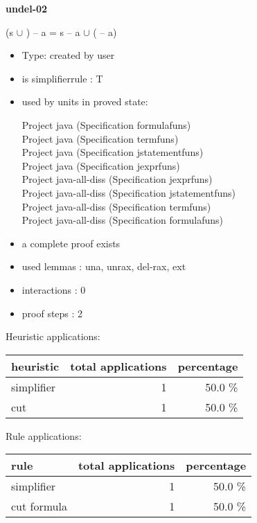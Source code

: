 \documentclass[a4paper]{article}
\begin{document}
{\LARGE\bf undel-02}\label{lemma-undel-02}

\medskip

 \Fol (s $\cup$ ) -- a = s -- a $\cup$ ( -- a)

\begin{itemize}

\item Type: created by user

\item is simplifierrule : T
\item used by units in proved state:

Project java (Specification formulafuns) \\
Project java (Specification termfuns) \\
Project java (Specification jstatementfuns) \\
Project java (Specification jexprfuns) \\
Project java-all-diss (Specification jexprfuns) \\
Project java-all-diss (Specification jstatementfuns) \\
Project java-all-diss (Specification termfuns) \\
Project java-all-diss (Specification formulafuns)
\item       a complete proof exists
\item       used lemmas  : una, unrax, del-rax, ext
\item       interactions : 0
\item       proof steps  : 2
\end{itemize}

\medskip


Heuristic applications:

\begin{supertabular}{l|r|r}
heuristic	& total applications & percentage \\ \hline
simplifier & 1 & 50.0 \% \\
cut & 1 & 50.0 \% \\

\end{supertabular}

Rule applications:

\begin{supertabular}{l|r|r}
rule	        & total applications & percentage \\ \hline
simplifier & 1 & 50.0 \% \\
cut formula & 1 & 50.0 \% \\

\end{supertabular}
\end{document}
